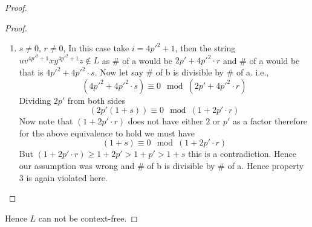 \begin{soln}
\begin{proof}
\begin{proof}
\begin{enumerate}
    \item $s \neq 0$, $r \neq 0$, In this case take $i=4{p'}^2+1$, then the string  $uv^{4{p'}^2+1}xy^{4{p'}^2+1}z \notin L$ as \# of a would be $2p'+4{p'}^2 \cdot r$ and \# of a would be that is $4{p'}^2 +4{p'}^2 \cdot s$.
    \newline Now let say \# of b is divisible by \# of a. i.e.,
    \[
    (4{p'}^2 +4{p'}^2 \cdot s) \equiv 0 \mod (2p'+4{p'}^2 \cdot r)
    \]
    Dividing $2p'$ from both sides
    \[
    (2p'(1 + s)) \equiv 0 \mod (1+ 2p' \cdot r)
    \]
    Now note that $(1+2p' \cdot r)$ does not have either $2$ or $p'$ as a factor therefore for the above equivalence to hold we must have
    \[
    (1 + s) \equiv 0 \mod (1+ 2p' \cdot r)
    \]
    But $(1+2p' \cdot r) \geq 1+2p' > 1+p' > 1+s$ this is a contradiction. Hence our assumption was wrong and \# of b is divisible by
    \# of a.
    Hence property 3 is again violated here.
\end{enumerate}
\end{proof}
Hence $L$ can not be context-free.
\end{proof}
\end{soln}
